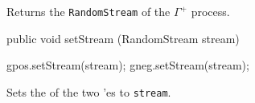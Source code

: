 \begin{tabb}
Returns the \texttt{RandomStream} of  the $\Gamma^{+}$ process.
\end{tabb}
\begin{code}

   public void setStream (RandomStream stream) \begin{hide} {
         gpos.setStream(stream);
         gneg.setStream(stream);
   }\end{hide}
\end{code}
\begin{tabb}
Sets the 
of the two 'es to  \texttt{stream}.
\end{tabb}
\begin{code}\begin{hide}
}
\end{hide}\end{code}
